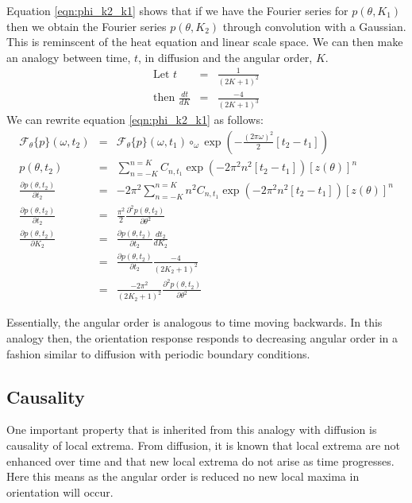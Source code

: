 \documentclass{article}
\begin{document}
Equation \ref{eqn:phi_k2_k1} shows that if we have the Fourier series for $ p(\theta,K_1) $ then we obtain the Fourier series $ p(\theta,K_2) $ through convolution with a Gaussian. This is reminscent of the heat equation and linear scale space. We can then make an analogy between time, $ t $, in diffusion and the angular order, $ K $.
\begin{eqnarray} 
	\mbox{Let } t & = & \frac{1}{(2K+1)^2} \\
	\mbox{then } \frac{dt}{dK} & = & \frac{-4}{(2K+1)^3} 
\end{eqnarray}
We can rewrite equation \ref{eqn:phi_k2_k1} as follows:
\begin{eqnarray}
	\mathcal{F}_\theta \{ p \} (\omega,t_2) & = & \mathcal{F}_\theta \{ p \} (\omega,t_1)  \circ_\omega \exp\left(- \frac{(2\pi\omega)^2}{2}  \left[ t_2 - t_1 \right] \right) \\
	p(\theta,t_2) & = & \sum_{n=-K}^{n=K} C_{n,t_1} \exp(-2\pi^2 n^2 \left[t_2-t_1\right]) \left[ z(\theta) \right]^n  \\
	\frac{\partial p(\theta,t_2)}{\partial t_2} & = & -2 \pi^2 \sum_{n=-K}^{n=K} n^2 C_{n,t_1} \exp(-2\pi^2 n^2 \left[t_2-t_1\right]) \left[ z(\theta) \right]^n  \\
	\frac{\partial p(\theta,t_2)}{\partial t_2} & = & \frac{\pi^2}{2} \frac{\partial^2 p(\theta, t_2)}{\partial \theta^2} \label{eqn:heateqn} \\
	\frac{\partial p(\theta,t_2)}{\partial K_2} & = & \frac{\partial p(\theta,t_2)}{\partial t_2} \frac{dt_2}{dK_2}  \\
	& = &  \frac{\partial p(\theta,t_2)}{\partial t_2} \frac{-4}{(2K_2+1)^2} \\
	& = &  \frac{-2 \pi^2 }{(2K_2+1)^2} \frac{\partial^2 p(\theta, t_2)}{\partial \theta^2} 
\end{eqnarray}

Essentially, the angular order is analogous to time moving backwards. In this analogy then, the orientation response responds to decreasing angular order in a fashion similar to diffusion with periodic boundary conditions.

\subsection{Causality}
One important property that is inherited from this analogy with diffusion is causality of local extrema. From diffusion, it is known that local extrema are not enhanced over time and that new local extrema do not arise as time progresses. Here this means as the angular order is reduced no new local maxima in orientation will occur.
\end{document}
